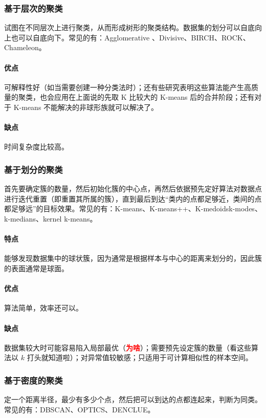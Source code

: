 \subsubsection{基于层次的聚类}
试图在不同层次上进行聚类，从而形成树形的聚类结构。数据集的划分可以自底向上也可以自底向下。常见的有：Agglomerative 、Divisive、BIRCH、ROCK、Chameleon。

\paragraph{优点}可解释性好（如当需要创建一种分类法时）；还有些研究表明这些算法能产生高质量的聚类，也会应用在上面说的先取 K 比较大的 K-means 后的合并阶段；还有对于 K-means 不能解决的非球形族就可以解决了。 

\paragraph{缺点}时间复杂度比较高。

\subsubsection{基于划分的聚类}
首先要确定簇的数量，然后初始化簇的中心点，再然后依据预先定好算法对数据点进行迭代重置（即重置其所属的簇），直到最后到达“类内的点都足够近，类间的点都足够远”的目标效果。常见的有：K-means、K-means++、K-medoidsk-modes、k-medians、kernel k-means。

\paragraph{特点}能够发现数据集中的球状簇，因为通常是根据样本与中心的距离来划分的，因此簇的表面通常是球面。

\paragraph{优点}算法简单，效率还可以。

\paragraph{缺点}数据集较大时可能容易陷入局部最优（\textcolor{red}{\textbf{为啥}}）；需要预先设定簇的数量（看这些算法以 $k$ 打头就知道啦）；对异常值较敏感；只适用于可计算相似性的样本空间。
	
\subsubsection{基于密度的聚类}
定一个距离半径，最少有多少个点，然后把可以到达的点都连起来，判断为同类。常见的有：DBSCAN、OPTICS、DENCLUE。

